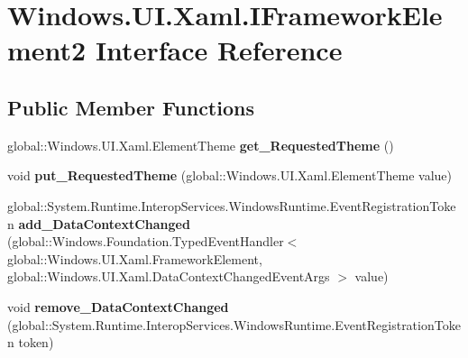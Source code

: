 \hypertarget{interface_windows_1_1_u_i_1_1_xaml_1_1_i_framework_element2}{}\section{Windows.\+U\+I.\+Xaml.\+I\+Framework\+Element2 Interface Reference}
\label{interface_windows_1_1_u_i_1_1_xaml_1_1_i_framework_element2}
\subsection*{Public Member Functions}
\begin{DoxyCompactItemize}
\item 
\mbox{\label{interface_windows_1_1_u_i_1_1_xaml_1_1_i_framework_element2_a969f6e448f093c9b73dff8beca767352}} 
global\+::\+Windows.\+U\+I.\+Xaml.\+Element\+Theme {\bfseries get\+\_\+\+Requested\+Theme} ()
\item 
\mbox{\label{interface_windows_1_1_u_i_1_1_xaml_1_1_i_framework_element2_a26887378d15655bc116fd7e94f99fc48}} 
void {\bfseries put\+\_\+\+Requested\+Theme} (global\+::\+Windows.\+U\+I.\+Xaml.\+Element\+Theme value)
\item 
\mbox{\label{interface_windows_1_1_u_i_1_1_xaml_1_1_i_framework_element2_a204d781ea5edc2c05e9d47534d5027ae}} 
global\+::\+System.\+Runtime.\+Interop\+Services.\+Windows\+Runtime.\+Event\+Registration\+Token {\bfseries add\+\_\+\+Data\+Context\+Changed} (global\+::\+Windows.\+Foundation.\+Typed\+Event\+Handler$<$ global\+::\+Windows.\+U\+I.\+Xaml.\+Framework\+Element, global\+::\+Windows.\+U\+I.\+Xaml.\+Data\+Context\+Changed\+Event\+Args $>$ value)
\item 
\mbox{\label{interface_windows_1_1_u_i_1_1_xaml_1_1_i_framework_element2_a04219d0d5da2859d2265a4df37e64985}} 
void {\bfseries remove\+\_\+\+Data\+Context\+Changed} (global\+::\+System.\+Runtime.\+Interop\+Services.\+Windows\+Runtime.\+Event\+Registration\+Token token)
\item 
\mbox{\label{interface_windows_1_1_u_i_1_1_xaml_1_1_i_framework_element2_a969f6e448f093c9b73dff8beca767352}} 

\end{DoxyCompactItemize}
